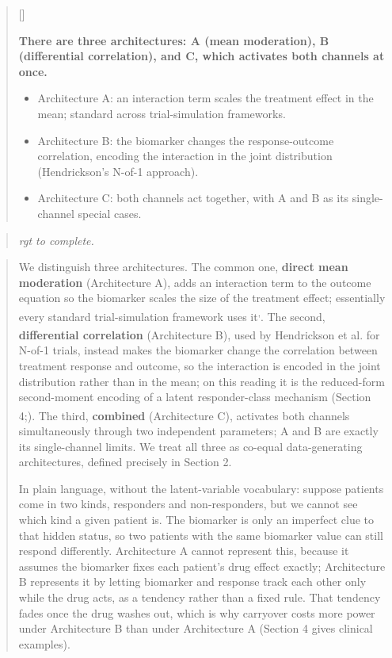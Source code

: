 \documentclass[
  11pt,
]{article}
\newcounter{pgraph}
\newenvironment{bullets}{%
  \stepcounter{pgraph}%
  \begin{quote}\small\sffamily\color[gray]{0.30}%
  {\normalfont\scriptsize\color[gray]{0.58}[\thepgraph]\enspace}}{%
  \end{quote}}
\newenvironment{rgt}{%
  \begin{quote}\small\itshape\color[RGB]{20,60,160}}{%
  \end{quote}}
\newenvironment{orig}{%
  \begin{quote}\normalsize\color[gray]{0.55}}{%
  \end{quote}}
\begin{document}
\begin{bullets}

\textbf{There are three architectures: A (mean moderation), B
(differential correlation), and C, which activates both channels at
once.}

\begin{itemize}\setlength{\itemsep}{2pt}\setlength{\parskip}{0pt}
\item Architecture A: an interaction term scales the treatment
effect in the mean; standard across trial-simulation frameworks.
\item Architecture B: the biomarker changes the response-outcome
correlation, encoding the interaction in the joint distribution
(Hendrickson's N-of-1 approach).
\item Architecture C: both channels act together, with A and B as
its single-channel special cases.
\end{itemize}

\end{bullets}

\begin{rgt}
rgt to complete.

\end{rgt}

\begin{orig}
We distinguish three architectures. The common one, \textbf{direct mean
moderation} (Architecture A), adds an interaction term to the outcome
equation so the biomarker scales the size of the treatment effect;
essentially every standard trial-simulation framework uses
it\textsuperscript{,}.
The second, \textbf{differential correlation} (Architecture B), used by
Hendrickson et al.\textsuperscript{}
for N-of-1 trials, instead makes the biomarker change the correlation
between treatment response and outcome, so the interaction is encoded in
the joint distribution rather than in the mean; on this reading it is
the reduced-form second-moment encoding of a latent responder-class
mechanism (Section
4;\textsuperscript{}). The third,
\textbf{combined} (Architecture C), activates both channels
simultaneously through two independent parameters; A and B are exactly
its single-channel limits. We treat all three as co-equal
data-generating architectures, defined precisely in Section 2.

In plain language, without the latent-variable vocabulary: suppose
patients come in two kinds, responders and non-responders, but we cannot
see which kind a given patient is. The biomarker is only an imperfect
clue to that hidden status, so two patients with the same biomarker
value can still respond differently. Architecture A cannot represent
this, because it assumes the biomarker fixes each patient's drug effect
exactly; Architecture B represents it by letting biomarker and response
track each other only while the drug acts, as a tendency rather than a
fixed rule. That tendency fades once the drug washes out, which is why
carryover costs more power under Architecture B than under Architecture
A (Section 4 gives clinical examples).

\end{orig}
\end{document}
